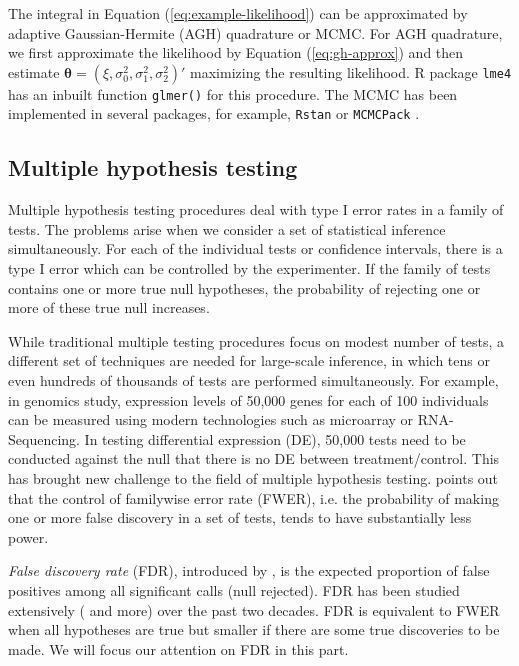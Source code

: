 The integral in Equation (\ref{eq:example-likelihood}) can be approximated by adaptive
Gaussian-Hermite (AGH) quadrature or MCMC. For AGH quadrature, we first approximate the likelihood
by Equation (\ref{eq:gh-approx}) and then estimate $\bm\theta = (\xi, \sigma_0^2, \sigma_1^2,
\sigma_2^2)'$ maximizing the resulting likelihood. R package \verb"lme4" \citep{bates2012lme4} has
an inbuilt function \verb"glmer()" for this procedure. The MCMC has been implemented in several
packages, for example, \verb|Rstan| \citep{Rstan} or \verb|MCMCPack| \citep{martin2011mcmcpack}. 

\subsection{Multiple hypothesis testing}
Multiple hypothesis testing procedures deal with type I error rates in a family of tests. The
problems arise when we consider a set of statistical inference simultaneously.  For each of the
individual tests or confidence intervals, there is a type I error which can be controlled by the
experimenter.  If the family of tests contains one or more true null hypotheses, the probability of
rejecting one or more of these true null increases. 

While traditional multiple testing procedures focus on modest number of tests, a different set of
techniques are needed for large-scale inference, in which tens or even hundreds of thousands of
tests are performed simultaneously. For example, in genomics study, expression levels of 50,000
genes for each of 100 individuals can be measured using modern technologies such as microarray or
RNA-Sequencing. In testing differential expression (DE), 50,000 tests need to be conducted against
the null that there is no DE between treatment/control. This has brought new challenge to the field
of multiple hypothesis testing. \cite{benjamini1995controlling} points out that the control of
familywise error rate (FWER), i.e. the probability of making one or more false discovery in a set
of
tests, tends to have substantially less power. 

\textit{False discovery rate} (FDR), introduced by \cite{benjamini1995controlling}, is the expected
proportion of false positives among all significant calls (null rejected). FDR has been studied
extensively (\cite{benjamini2001control,efron2004large,efron2010large,storey2003statistical} and
more) over the past two decades.  FDR is equivalent to FWER \citep{benjamini1995controlling} when
all hypotheses are true but smaller if there are some true discoveries to be made. We will focus
our
attention on FDR in this part. 

